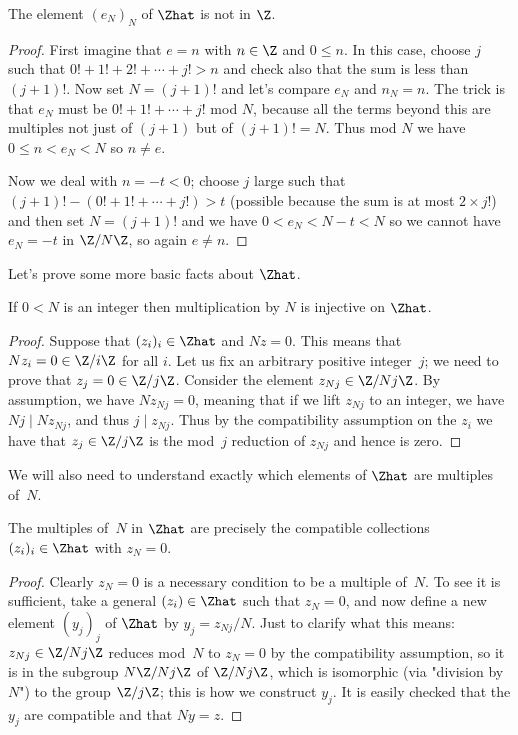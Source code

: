 \begin{lemma}
    \label{ZHat.e_not_in_Int}
    \leanok
    The element $(e_N)_N$ of $\Zhat$ is not in $\Z$.
\end{lemma}
\begin{proof}
    \leanok
    First imagine that $e=n$ with $n\in\Z$ and $0\leq n$. In this case, choose $j$
    such that $0!+1!+2!+\cdots+j!>n$ and check also that the sum is less
    than $(j+1)!$. Now set $N=(j+1)!$ and let's compare $e_N$
    and $n_N=n$. The trick is that $e_N$ must be $0!+1!+\cdots+j!$ mod $N$,
    because all the terms beyond this are multiples not just of $(j+1)$ but
    of $(j+1)!=N$. Thus mod $N$ we have $0\leq n<e_N<N$ so $n\not=e$.

    Now we deal with $n=-t<0$; choose $j$ large such that
    $(j+1)!-(0!+1!+\cdots+j!)>t$ (possible because the sum is at most $2\times j!$)
    and then set $N=(j+1)!$ and we have $0 < e_N<N-t<N$ so we cannot have $e_N=-t$ in $\Z/N\Z$,
    so again $e\not=n$.
\end{proof}

Let's prove some more basic facts about $\Zhat$.

\begin{lemma}
    \label{ZHat.torsionfree}
    \leanok
    If $0<N$ is an integer then multiplication by $N$ is injective on $\Zhat$.
\end{lemma}
\begin{proof}
    \leanok
    Suppose that $(z_i)_i\in\Zhat$ and $Nz=0$. This means that $Nz_i=0\in\Z/i\Z$ for all $i$.
    Let us fix an arbitrary positive integer~$j$; we need to prove that $z_j=0\in\Z/j\Z$.
    Consider the element $z_{Nj}\in\Z/Nj\Z$. By assumption, we have $Nz_{Nj}=0$, meaning that
    if we lift $z_{Nj}$ to an integer, we have $Nj\mid Nz_{Nj}$, and thus $j\mid z_{Nj}$.
    Thus by the compatibility assumption on the $z_i$ we have that $z_j\in\Z/j\Z$ is the
    mod~$j$ reduction of $z_{Nj}$ and hence is zero.
\end{proof}

We will also need to understand exactly which elements of $\Zhat$
are multiples of~$N$.

\begin{lemma}
    \label{ZHat.multiples}
    \leanok
    The multiples of~$N$ in $\Zhat$ are precisely the compatible collections $(z_i)_i\in\Zhat$
    with $z_N=0$.
\end{lemma}
\begin{proof} \leanok
    Clearly $z_N=0$ is a necessary condition to be a multiple of~$N$. To see it is sufficient,
    take a general $(z_i)\in\Zhat$ such that $z_N=0$,
    and now define a new element $(y_j)_j$ of $\Zhat$
    by $y_j=z_{Nj}/N$. Just to clarify what this means: $z_{Nj}\in\Z/Nj\Z$ reduces mod~$N$
    to $z_N=0$ by the compatibility assumption, so it is in the subgroup $N\Z/Nj\Z$ of $\Z/Nj\Z$,
    which is isomorphic (via "division by $N$") to the group $\Z/j\Z$; this is how we construct
    $y_j$. It is easily checked that the $y_j$ are compatible and that $Ny=z$.
\end{proof}


